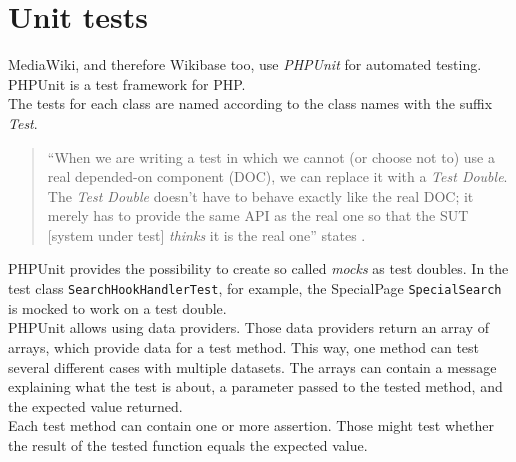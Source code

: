 \section{Unit tests}

MediaWiki, and therefore Wikibase too, use \textit{PHPUnit} for automated testing. PHPUnit is a test framework for PHP. \\
The tests for each class are named according to the class names with the suffix \textit{Test}. \\
\begin{quote}
 ``When we are writing a test in which we cannot (or choose not to) use a real depended-on component (DOC), we can replace it with a \textit{Test Double}. The \textit{Test Double} doesn't have to behave exactly like the real DOC; it merely has to provide the same API as the real one so that the SUT [system under test] \textit{thinks} it is the real one'' states \citet{testing}. 
\end{quote}
PHPUnit provides the possibility to create so called \textit{mocks} as test doubles. In the test class \texttt{SearchHookHandlerTest}, for example, the SpecialPage \texttt{SpecialSearch} is mocked to work on a test double. \\
PHPUnit allows using data providers. Those data providers return an array of arrays, which provide data for a test method. This way, one method can test several different cases with multiple datasets. The arrays can contain a message explaining what the test is about, a parameter passed to the tested method, and the expected value returned. \\
Each test method can contain one or more assertion. Those might test whether the result of the tested function equals the expected value. 

